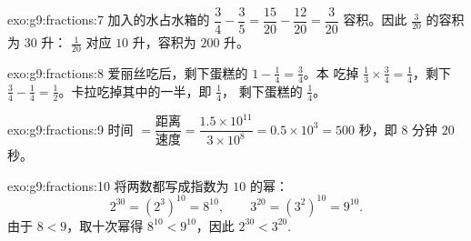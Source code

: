 \begin{solution}{exo:g9:fractions:7}
加入的水占水箱的
$\dfrac34 - \dfrac35 = \dfrac{15}{20} - \dfrac{12}{20} = \dfrac{3}{20}$
容积。因此 $\frac{3}{20}$ 的容积为 $30$ 升：
$\frac{1}{20}$ 对应 $10$ 升，容积为 $200$ 升。
\end{solution}

\begin{solution}{exo:g9:fractions:8}
爱丽丝吃后，剩下蛋糕的 $1 - \frac14 = \frac34$。本
吃掉 $\frac13 \times \frac34 = \frac14$，剩下
$\frac34 - \frac14 = \frac12$。卡拉吃掉其中的一半，即 $\frac14$，
剩下蛋糕的 $\frac14$。
\end{solution}

\begin{solution}{exo:g9:fractions:9}
时间 $= \dfrac{\text{距离}}{\text{速度}} =
\dfrac{1.5 \times 10^{11}}{3 \times 10^8} = 0.5 \times 10^3 = 500$
秒，即 $8$ 分钟 $20$ 秒。
\end{solution}

\begin{solution}{exo:g9:fractions:10}
将两数都写成指数为 $10$ 的幂：
\[
2^{30} = \left(2^3\right)^{10} = 8^{10},
\qquad
3^{20} = \left(3^2\right)^{10} = 9^{10}.
\]
由于 $8 < 9$，取十次幂得 $8^{10} < 9^{10}$，因此
$2^{30} < 3^{20}$.
\end{solution}

